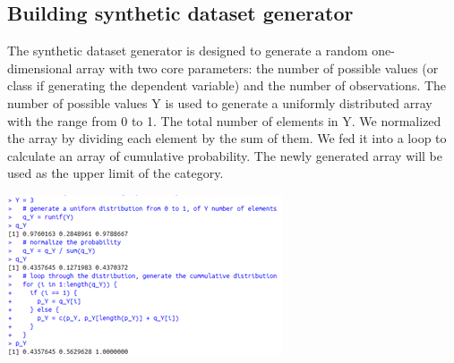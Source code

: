 \documentclass{article}
\begin{document}
\begin{multicols}{2}
\subsection{Building synthetic dataset generator}
The synthetic dataset generator is designed to generate a random one-dimensional array with two core parameters: the number of possible values (or class if generating the dependent variable) and the number of observations.
The number of possible values Y is used to generate a uniformly distributed array with the range from 0 to 1. The total number of elements in Y. We normalized the array by dividing each element by the sum of them. We fed it into a loop to calculate an array of cumulative probability. The newly generated array will be used as the upper limit of the category. 

\includegraphics{fig1.png}


\end{multicols}
\end{document}
